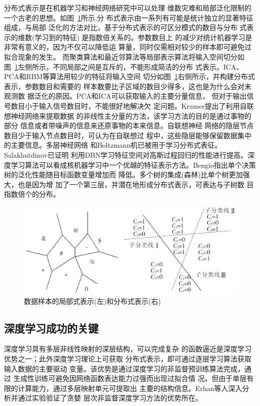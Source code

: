 \documentclass[UTF8]{article}
\begin{document}
	分布式表示\cite{v18}是在机器学习和神经网络研究中可以处理
	维数灾难和局部泛化限制的一个古老的思想。如图~\ref{fig:p1}所示,分
	布式表示由一系列有可能是统计独立的显著特征组成，与局部
	泛化的方法对比，基于分布式表示的可区分模式的数目与分布
	式表示的维数(学习到的特征) 是指数倍关系的。参数数目上
	的减少对统计机器学习是非常有意义的，因为不仅可以降低运
	算量，同时仅需相对较少的样本即可避免过拟合现象的发生。
	而聚类算法和最近邻算法等局部表示算法将输入空间切分如
	图~\ref{fig:p1}左侧所示，不同局部之间是互斥的，不能形成简洁的分布
	式表示。ICA、PCA和RBM等算法用较少的特征将输入空间
	切分如图~\ref{fig:p1}右侧所示，并构建分布式表示，参数数目和需要的
	样本数要比子区域的数目少得多，这也是为什么会对未观测数
	据泛化的原因。PCA和ICA可以获取输入的主要分量信息，
	但对于输出信号数目小于输入信号数目时，不能很好地解决欠
	定问题。Kramer\cite{v19}提出了利用自联想神经网络来提取数据
	的非线性主分量的方法，该学习方法的目的是通过事物的部分
	信息或者带噪声的信息来还原事物的本来信息。自联想神经
	网络的隐层节点数目少于输入节点数目时，可认为在自联想过
	程中，这些隐层能够保留数据集中的主要信息。多层神经网络
	和Boltzmann机已被用于学习分布式表征。Salakhutdinov\cite{v20}已证明
	利用DBN学习特征空间对高斯过程回归的性能进行提高。深
	度学习算法可以看成核机器学习中一个优越的特征表示方法。Bengio\cite{v2}指出单个决策树的泛化性能随目标函数变量增加而
	降低。多个树的集成(森林)比单个树更加强大，也是因为增
	加了一个第三层，并潜在地形成分布式表示，可表达与子树数
	目指数倍个的分布。
	
	\begin{figure}[htbp]
		\centering
		\includegraphics[scale = 0.2]{Figures/1.png} 
		\caption{数据样本的局部式表示(左)和分布式表示(右)}
		\label{fig:p1}
	\end{figure}
	
	
	\subsection{深度学习成功的关键}
	深度学习具有多层非线性映射的深层结构，可以完成复杂
	的函数逼近是深度学习优势之一；此外深度学习理论上可获取
	分布式表示，即可通过逐层学习算法获取输入数据的主要驱动
	变量。该优势是通过深度学习的非监督预训练算法完成，通过
	生成性训练可避免因网络函数表达能力过强而出现过拟合情
	况。但由于单层有限的计算能力，通过多层映射单元可提取出
	主要的结构信息。Erhan等人\cite{v15}深入分析并通过实验验证了贪婪
	层次非监督深度学习方法的优势所在。
	
\end{document}
